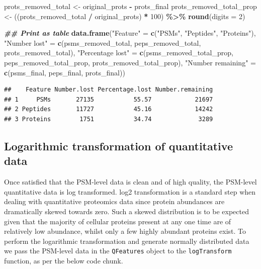 \documentclass[9pt,a4paper,]{extarticle}
\newenvironment{Shaded}{\begin{snugshade}}{\end{snugshade}}
\newcommand{\AttributeTok}[1]{\textcolor[rgb]{0.13,0.29,0.53}{#1}}
\newcommand{\DecValTok}[1]{\textcolor[rgb]{0.00,0.00,0.81}{#1}}
\newcommand{\DocumentationTok}[1]{\textcolor[rgb]{0.56,0.35,0.01}{\textbf{\textit{#1}}}}
\newcommand{\FunctionTok}[1]{\textcolor[rgb]{0.13,0.29,0.53}{\textbf{#1}}}
\newcommand{\NormalTok}[1]{#1}
\newcommand{\OtherTok}[1]{\textcolor[rgb]{0.56,0.35,0.01}{#1}}
\newcommand{\SpecialCharTok}[1]{\textcolor[rgb]{0.81,0.36,0.00}{\textbf{#1}}}
\newcommand{\StringTok}[1]{\textcolor[rgb]{0.31,0.60,0.02}{#1}}
\begin{document}
\begin{Shaded}
\begin{Highlighting}[]
\NormalTok{prots\_removed\_total }\OtherTok{\textless{}{-}}\NormalTok{ original\_prots }\SpecialCharTok{{-}}\NormalTok{ prots\_final}
\NormalTok{prots\_removed\_total\_prop }\OtherTok{\textless{}{-}}\NormalTok{ ((prots\_removed\_total }\SpecialCharTok{/}\NormalTok{ original\_prots) }\SpecialCharTok{*} \DecValTok{100}\NormalTok{) }\SpecialCharTok{\%\textgreater{}\%}
  \FunctionTok{round}\NormalTok{(}\AttributeTok{digits =} \DecValTok{2}\NormalTok{)}

\DocumentationTok{\#\# Print as table}
\FunctionTok{data.frame}\NormalTok{(}\StringTok{"Feature"} \OtherTok{=} \FunctionTok{c}\NormalTok{(}\StringTok{"PSMs"}\NormalTok{,}
                         \StringTok{"Peptides"}\NormalTok{,}
                         \StringTok{"Proteins"}\NormalTok{),}
           \StringTok{"Number lost"} \OtherTok{=} \FunctionTok{c}\NormalTok{(psms\_removed\_total,}
\NormalTok{                             peps\_removed\_total,}
\NormalTok{                             prots\_removed\_total),}
           \StringTok{"Percentage lost"} \OtherTok{=} \FunctionTok{c}\NormalTok{(psms\_removed\_total\_prop,}
\NormalTok{                                 peps\_removed\_total\_prop,}
\NormalTok{                                 prots\_removed\_total\_prop),}
           \StringTok{"Number remaining"} \OtherTok{=} \FunctionTok{c}\NormalTok{(psms\_final,}
\NormalTok{                                  peps\_final,}
\NormalTok{                                  prots\_final))}
\end{Highlighting}
\end{Shaded}

\begin{verbatim}
##    Feature Number.lost Percentage.lost Number.remaining
## 1     PSMs       27135           55.57            21697
## 2 Peptides       11727           45.16            14242
## 3 Proteins        1751           34.74             3289
\end{verbatim}

\hypertarget{logarithmic-transformation-of-quantitative-data}{%
\subsection{Logarithmic transformation of quantitative data}\label{logarithmic-transformation-of-quantitative-data}}

Once satisfied that the PSM-level data is clean and of high quality, the PSM-level
quantitative data is log transformed. log2 transformation is a standard
step when dealing with quantitative proteomics data since protein abundances are
dramatically skewed towards zero. Such a skewed distribution is to be expected
given that the majority of cellular proteins present at any one time are of
relatively low abundance, whilst only a few highly abundant proteins exist. To
perform the logarithmic transformation and generate normally distributed data we
pass the PSM-level data in the \texttt{QFeatures} object to the \texttt{logTransform}
function, as per the below code chunk.
\end{document}

